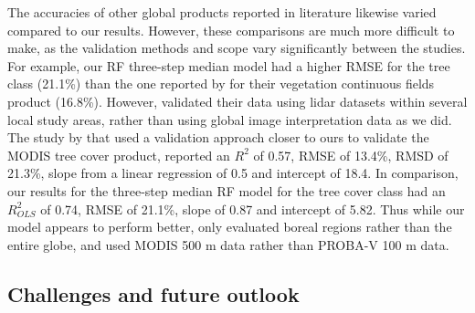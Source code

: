 \documentclass[review,authoryear,3p]{elsarticle}
\begin{document}
The accuracies of other global products reported in literature likewise varied compared to our results.
However, these comparisons are much more difficult to make, as the validation methods and scope vary significantly between the studies.
For example, our \gls{RF} three-step median model had a higher \gls{RMSE} for the tree class (21.1\%) than the one reported by \citet{sexton_global_2013} for their vegetation continuous fields product (16.8\%).
However, \citet{sexton_global_2013} validated their data using lidar datasets within several local study areas, rather than using global image interpretation data as we did.
The study by \citet{montesano_modis_2009} that used a validation approach closer to ours to validate the MODIS tree cover product, reported  an $R^2$ of 0.57, \gls{RMSE} of 13.4\%, RMSD of 21.3\%, slope from a linear regression of 0.5 and intercept of 18.4.
In comparison, our results for the three-step median \gls{RF} model for the tree cover class had an $R^2_{OLS}$ of 0.74, \gls{RMSE} of 21.1\%, slope of 0.87 and intercept of 5.82.
Thus while our model appears to perform better, \citet{montesano_modis_2009} only evaluated boreal regions rather than the entire globe, and used MODIS 500 m data rather than PROBA-V 100 m data.

\subsection{Challenges and future outlook}
\end{document}
